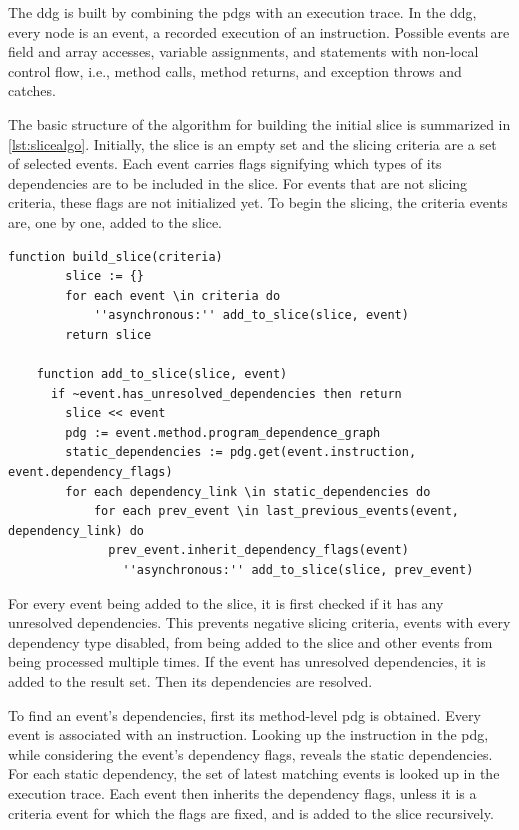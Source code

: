 The \acf{ddg} is built by combining the \acfp{pdg} with an execution trace.
In the \ac{ddg}, every node is an event, a recorded execution of an instruction.
Possible events are field and array accesses, variable assignments, and statements with non-local control flow, i.e., method calls, method returns, and exception throws and catches.

The basic structure of the algorithm for building the initial slice is summarized in \cref{lst:slicealgo}.
Initially, the slice is an empty set and the slicing criteria are a set of selected events.
Each event carries flags signifying which types of its dependencies are to be included in the slice.
For events that are not slicing criteria, these flags are not initialized yet.
To begin the slicing, the criteria events are, one by one, added to the slice.

\begin{lstlisting}[float=t,language=algorithm,label=lst:slicealgo,caption={Simplified algorithm for building the slice}]
	function build_slice(criteria)
		slice := {}
		for each event \in criteria do
			''asynchronous:'' add_to_slice(slice, event)
		return slice
		
	function add_to_slice(slice, event)
	  if ~event.has_unresolved_dependencies then return
		slice << event
		pdg := event.method.program_dependence_graph
		static_dependencies := pdg.get(event.instruction, event.dependency_flags)
		for each dependency_link \in static_dependencies do
			for each prev_event \in last_previous_events(event, dependency_link) do
			  prev_event.inherit_dependency_flags(event)
				''asynchronous:'' add_to_slice(slice, prev_event)
\end{lstlisting}

For every event being added to the slice, it is first checked if it has any unresolved dependencies.
This prevents negative slicing criteria, events with every dependency type disabled, from being added to the slice and other events from being processed multiple times.
If the event has unresolved dependencies, it is added to the result set. 
Then its dependencies are resolved.

To find an event's dependencies, first its method-level \ac{pdg} is obtained.
Every event is associated with an instruction.
Looking up the instruction in the \ac{pdg}, while considering the event's dependency flags, reveals the static dependencies.
For each static dependency, the set of latest matching events is looked up in the execution trace.
Each event then inherits the dependency flags, unless it is a criteria event for which the flags are fixed, and is added to the slice recursively.

